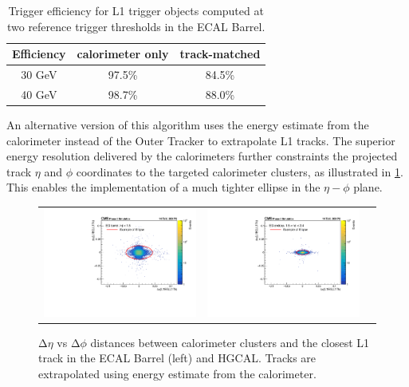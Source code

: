 \begin{table}[th]
\sffamily
\centering
\caption{Trigger efficiency for \ac{L1} trigger objects computed at two reference trigger thresholds in the \ac{ECAL} Barrel. }
\begin{tabular}{ccc} \toprule
Efficiency & calorimeter only & track-matched \\    \midrule
 30 GeV     & 97.5\%      & 84.5\%\\ \midrule
 40 GeV &  98.7\%     & 88.0\%\\ \bottomrule
\end{tabular}
\label{tab:L1Ele_Eff}
\end{table}

An alternative version of this algorithm uses the energy estimate from the calorimeter instead of the Outer Tracker to extrapolate \ac{L1} tracks. The superior energy resolution delivered by the calorimeters further constraints the projected track $\eta$ and $\phi$ coordinates to the targeted calorimeter clusters, as illustrated in \ref{fig:DR_electron}. This enables the implementation of a much tighter ellipse in the $\eta-\phi$ plane.

\begin{figure}[tbh!]
 \begin{center}
  \begin{tabular}{ccc}
   \includegraphics[width=.45\linewidth]{figures/Part2/Upgrade/DR_barrel_new}&
   \includegraphics[width=.45\linewidth]{figures/Part2/Upgrade/DR_endcap_new}&
  \end{tabular}
  \caption{$\mathrm{\Delta}\eta$ vs $\mathrm{\Delta}\phi$ distances between calorimeter clusters and the closest L1 track in the \ac{ECAL} Barrel (left) and \ac{HGCAL}. Tracks are extrapolated using energy estimate from the calorimeter.}
 \label{fig:DR_electron}
 \end{center}
\end{figure}

